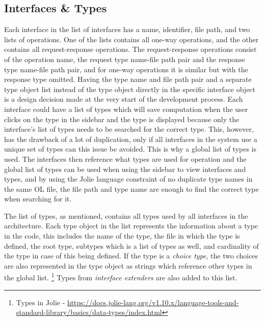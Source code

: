 \subsection{Interfaces \& Types}
Each interface in the list of interfaces has a name, identifier, file path, and two lists of operations.
One of the lists contains all one-way operations, and the other contains all request-response operations.
The request-response operations consist of the operation name, the request type name-file path pair and the response type name-file path pair, and for one-way operations it is similar but with the response type omitted.
Having the type name and file path pair and a separate type object list instead of the type object directly in the specific interface object is a design decision made at the very start of the development process.
Each interface could have a list of types which will save computation when the user clicks on the type in the sidebar and the type is displayed because only the interface's list of types needs to be searched for the correct type.
This, however, has the drawback of a lot of duplication, only if all interfaces in the system use a unique set of types can this issue be avoided.
This is why a global list of types is used. The interfaces then reference what types are used for operation and the global list of types can be used when using the sidebar to view interfaces and types, and by
using the Jolie language constraint of no duplicate type names in the same OL file, the file path and type name are enough to find the correct type when searching for it.

The list of types, as mentioned, contains all types used by all interfaces in the architecture.
Each type object in the list represents the information about a type in the code, this includes the name of the type, the file in which the type is defined, the root type, subtypes which is a list of types as well, and cardinality of the type in case of this being defined.
If the type is a \textit{choice type}, the two choices are also represented in the type object as strings which reference other types in the global list. \footnote{Types in Jolie - \url{https://docs.jolie-lang.org/v1.10.x/language-tools-and-standard-library/basics/data-types/index.html}}
Types from \textit{interface extenders} are also added to this list.

